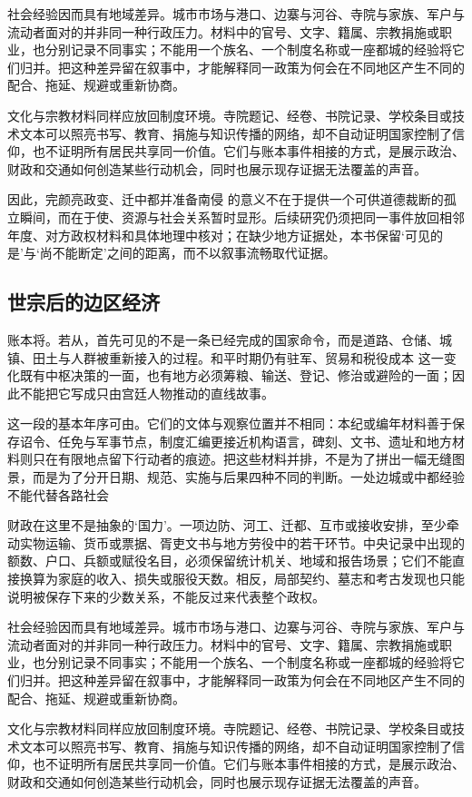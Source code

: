 社会经验因而具有地域差异。城市市场与港口、边寨与河谷、寺院与家族、军户与流动者面对的并非同一种行政压力。材料中的官号、文字、籍属、宗教捐施或职业，也分别记录不同事实；不能用一个族名、一个制度名称或一座都城的经验将它们归并。把这种差异留在叙事中，才能解释同一政策为何会在不同地区产生不同的配合、拖延、规避或重新协商。

文化与宗教材料同样应放回制度环境。寺院题记、经卷、书院记录、学校条目或技术文本可以照亮书写、教育、捐施与知识传播的网络，却不自动证明国家控制了信仰，也不证明所有居民共享同一价值。它们与账本事件相接的方式，是展示政治、财政和交通如何创造某些行动机会，同时也展示现存证据无法覆盖的声音。

因此，完颜亮政变、迁中都并准备南侵 的意义不在于提供一个可供道德裁断的孤立瞬间，而在于使、资源与社会关系暂时显形。后续研究仍须把同一事件放回相邻年度、对方政权材料和具体地理中核对；在缺少地方证据处，本书保留‘可见的是’与‘尚不能断定’之间的距离，而不以叙事流畅取代证据。

\subsection{世宗后的边区经济}

账本将。若从，首先可见的不是一条已经完成的国家命令，而是道路、仓储、城镇、田土与人群被重新接入的过程。和平时期仍有驻军、贸易和税役成本 这一变化既有中枢决策的一面，也有地方必须筹粮、输送、登记、修治或避险的一面；因此不能把它写成只由宫廷人物推动的直线故事。

这一段的基本年序可由。它们的文体与观察位置并不相同：本纪或编年材料善于保存诏令、任免与军事节点，制度汇编更接近机构语言，碑刻、文书、遗址和地方材料则只在有限地点留下行动者的痕迹。把这些材料并排，不是为了拼出一幅无缝图景，而是为了分开日期、规范、实施与后果四种不同的判断。一处边城或中都经验不能代替各路社会

财政在这里不是抽象的‘国力’。一项边防、河工、迁都、互市或接收安排，至少牵动实物运输、货币或票据、胥吏文书与地方劳役中的若干环节。中央记录中出现的额数、户口、兵额或赋役名目，必须保留统计机关、地域和报告场景；它们不能直接换算为家庭的收入、损失或服役天数。相反，局部契约、墓志和考古发现也只能说明被保存下来的少数关系，不能反过来代表整个政权。

社会经验因而具有地域差异。城市市场与港口、边寨与河谷、寺院与家族、军户与流动者面对的并非同一种行政压力。材料中的官号、文字、籍属、宗教捐施或职业，也分别记录不同事实；不能用一个族名、一个制度名称或一座都城的经验将它们归并。把这种差异留在叙事中，才能解释同一政策为何会在不同地区产生不同的配合、拖延、规避或重新协商。

文化与宗教材料同样应放回制度环境。寺院题记、经卷、书院记录、学校条目或技术文本可以照亮书写、教育、捐施与知识传播的网络，却不自动证明国家控制了信仰，也不证明所有居民共享同一价值。它们与账本事件相接的方式，是展示政治、财政和交通如何创造某些行动机会，同时也展示现存证据无法覆盖的声音。

